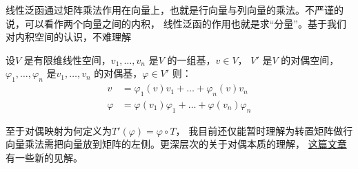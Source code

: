 线性泛函通过矩阵乘法作用在向量上，也就是行向量与列向量的乘法。不严谨的说，可以看作两个向量之间的内积，
线性泛函的作用也就是求``分量''。基于我们对内积空间的认识，不难理解
\begin{theorem}[对偶空间的元素分解]
    设\(V\) 是有限维线性空间，\(v_{1}, \dots ,v_{n}\) 是\(V\) 的一组基，\(v \in V\)，
    \(V'\) 是\(V\) 的对偶空间，\(\varphi_{1}, \dots ,\varphi_{n}\)
    是\(v_{1}, \dots ,v_{n}\) 的对偶基，\(\varphi \in V'\)
    则：
    \begin{align*}
        v &= \varphi_{1}(v)v_{1} + \dots + \varphi_{n}(v)v_{n} \\
        \varphi &= \varphi(v_{1})\varphi_{1} + \dots +
        \varphi(v_{n})\varphi_{n}
    \end{align*}
\end{theorem}

至于对偶映射为何定义为\(T'(\varphi)=\varphi \circ T\)，
我目前还仅能暂时理解为转置矩阵做行向量乘法需把向量放到矩阵的左侧。更深层次的关于对偶本质的理解，
\href{https://www.zhihu.com/question/38464481/answer/2110009942}{这篇文章}
有一些新的见解。
